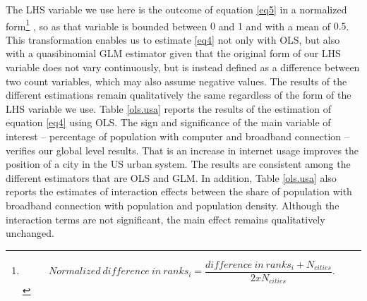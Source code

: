 \documentclass[10pt,letterpaper]{article}
\begin{document}
The LHS variable we use here is the outcome of equation \ref{eq5} in a
normalized form\footnote{\[Normalized\:difference\:in\:ranks_{i} = \frac{difference\:in\:ranks_{i} + N_{cities}}{2xN_{cities}}.\]}
, so as that variable is bounded between \(0\) and \(1\) and with a mean
of \(0.5\). This transformation enables us to estimate \ref{eq4} not
only with OLS, but also with a quasibinomial GLM estimator given that
the original form of our LHS variable does not vary continuously, but is
instead defined as a difference between two count variables, which may
also assume negative values. The results of the different estimations
remain qualitatively the same regardless of the form of the LHS variable
we use. Table \ref{ols.usa} reports the results of the estimation of
equation \ref{eq4} using OLS. The sign and significance of the main
variable of interest -- percentage of population with computer and
broadband connection -- verifies our global level results. That is an
increase in internet usage improves the position of a city in the US
urban system. The results are consistent among the different estimators
that are OLS and GLM. In addition, Table \ref{ols.usa} also reports the
estimates of interaction effects between the share of population with
broadband connection with population and population density. Although
the interaction terms are not significant, the main effect remains
qualitatively unchanged.
\end{document}
